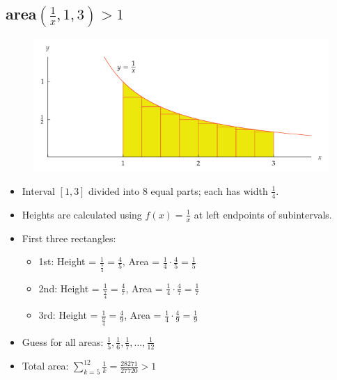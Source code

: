 \subsection{area\((\frac{1}{x},1,3) > 1 \) }
\begin{figure}
  \includegraphics[scale=0.28]{pics/e_3.png}
\end{figure}
\begin{itemize}
  \item Interval \([1, 3]\) divided into 8 equal parts; each has width \(\frac{1}{4}\).
  \item Heights are calculated using \(f(x) = \frac{1}{x}\) at left endpoints of subintervals.
  \item First three rectangles:
  \begin{itemize}
      \item 1st: Height = \(\frac{1}{\frac{5}{4}} = \frac{4}{5}\), Area = \(\frac{1}{4} \cdot \frac{4}{5} = \frac{1}{5}\)
      \item 2nd: Height = \(\frac{1}{\frac{7}{4}} = \frac{4}{7}\), Area = \(\frac{1}{4} \cdot \frac{4}{7} = \frac{1}{7}\)
      \item 3rd: Height = \(\frac{1}{\frac{9}{4}} = \frac{4}{9}\), Area = \(\frac{1}{4} \cdot \frac{4}{9} = \frac{1}{9}\)
  \end{itemize}
  \item Guess for all areas: \(\frac{1}{5}, \frac{1}{6}, \frac{1}{7}, \dots, \frac{1}{12}\)
  \item Total area: \(\sum_{k=5}^{12} \frac{1}{k} = \frac{28271}{27720} > 1\)
\end{itemize}


